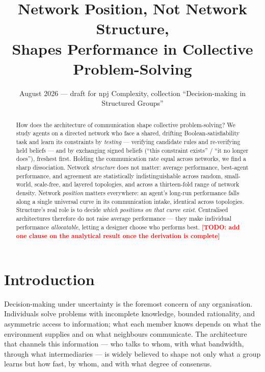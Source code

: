 \documentclass{article}
\title{Network Position, Not Network Structure,\\ Shapes Performance in Collective Problem-Solving}
\author{\todo{author list and affiliations}}
\date{August 2026 --- draft for npj Complexity, collection ``Decision-making in Structured Groups''}
\newcommand{\todo}[1]{\textcolor{red}{\textbf{[TODO: #1]}}}
\begin{document}
\maketitle

\begin{abstract}
How does the architecture of communication shape collective problem-solving? We study agents on a directed network who face a shared, drifting Boolean-satisfiability task and learn its constraints by \emph{testing} --- verifying candidate rules and re-verifying held beliefs --- and by exchanging signed beliefs (``this constraint exists'' / ``it no longer does''), freshest first. Holding the communication rate equal across networks, we find a sharp dissociation. Network \emph{structure} does not matter: average performance, best-agent performance, and agreement are statistically indistinguishable across random, small-world, scale-free, and layered topologies, and across a thirteen-fold range of network density. Network \emph{position} matters everywhere: an agent's long-run performance falls along a single universal curve in its communication intake, identical across topologies. Structure's real role is to decide \emph{which positions on that curve exist}. Centralised architectures therefore do not raise average performance --- they make individual performance \emph{allocatable}, letting a designer choose who performs best. \todo{add one clause on the analytical result once the derivation is complete}
\end{abstract}


\section{Introduction}\label{sec:intro}

Decision-making under uncertainty is the foremost concern of any organisation. Individuals solve problems with incomplete knowledge, bounded rationality, and asymmetric access to information; what each member knows depends on what the environment supplies and on what neighbours communicate. The architecture that channels this information --- who talks to whom, with what bandwidth, through what intermediaries --- is widely believed to shape not only what a group learns but how fast, by whom, and with what degree of consensus.
\end{document}
